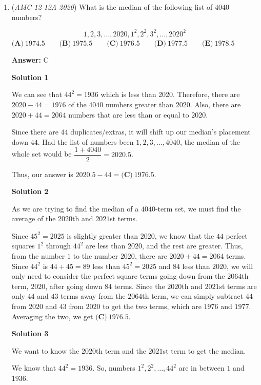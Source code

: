 \begin{enumerate}
 Education, The Study of Everything

 


	\item (\textit{AMC 12 12A 2020}) What is the median of the following list of $4040$ numbers$?$

 \[1, 2, 3, \ldots, 2020, 1^2, 2^2, 3^2, \ldots, 2020^2\]
$\textbf{(A)}\ 1974.5\qquad\textbf{(B)}\ 1975.5\qquad\textbf{(C)}\ 1976.5\qquad\textbf{(D)}\ 1977.5\qquad\textbf{(E)}\ 1978.5$

 \textbf{Answer: }C



\textbf{Solution 1}

We can see that $44^2=1936$ which is less than 2020. Therefore, there are $2020-44=1976$ of the $4040$ numbers greater than $2020$. Also, there are $2020+44=2064$ numbers that are less than or equal to $2020$. 

 Since there are $44$ duplicates/extras, it will shift up our median's placement down $44$. Had the list of numbers been $1,2,3, \dots, 4040$, the median of the whole set would be $\dfrac{1+4040}{2}=2020.5$. 

 Thus, our answer is $2020.5-44=\boxed{\textbf{(C)}\ 1976.5}$.

 



\textbf{Solution 2}

As we are trying to find the median of a $4040$-term set, we must find the average of the $2020$th and $2021$st terms.

 Since $45^2 = 2025$ is slightly greater than $2020$, we know that the $44$ perfect squares $1^2$ through $44^2$ are less than $2020$, and the rest are greater. Thus, from the number $1$ to the number $2020$, there are $2020 + 44 = 2064$ terms. Since $44^2$ is $44 + 45 = 89$ less than $45^2 = 2025$ and $84$ less than $2020$, we will only need to consider the perfect square terms going down from the $2064$th term, $2020$, after going down $84$ terms. Since the $2020$th and $2021$st terms are only $44$ and $43$ terms away from the $2064$th term, we can simply subtract $44$ from $2020$ and $43$ from $2020$ to get the two terms, which are $1976$ and $1977$. Averaging the two, we get $\boxed{\textbf{(C)}\ 1976.5}.$




\textbf{Solution 3}

We want to know the $2020$th term and the $2021$st term to get the median.

 We know that $44^2=1936$. So, numbers $1^2, 2^2, \ldots,44^2$ are in between $1$ and $1936$.


\end{enumerate}

